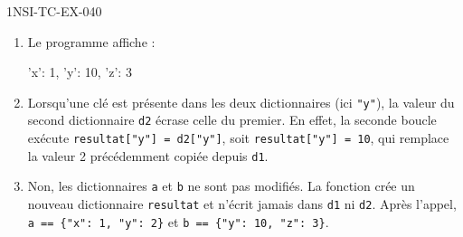 \begin{corrige}{1NSI-TC-EX-040}
\begin{enumerate}
  \item Le programme affiche :
\begin{console}
{'x': 1, 'y': 10, 'z': 3}
\end{console}

  \item Lorsqu'une clé est présente dans les deux dictionnaires (ici \lstinline{"y"}), la valeur du second dictionnaire \lstinline{d2} écrase celle du premier. En effet, la seconde boucle exécute \lstinline{resultat["y"] = d2["y"]}, soit \lstinline{resultat["y"] = 10}, qui remplace la valeur 2 précédemment copiée depuis \lstinline{d1}.

  \item Non, les dictionnaires \lstinline{a} et \lstinline{b} ne sont pas modifiés. La fonction crée un nouveau dictionnaire \lstinline{resultat} et n'écrit jamais dans \lstinline{d1} ni \lstinline{d2}. Après l'appel, \lstinline|a == {"x": 1, "y": 2}| et \lstinline|b == {"y": 10, "z": 3}|.
\end{enumerate}
\end{corrige}
